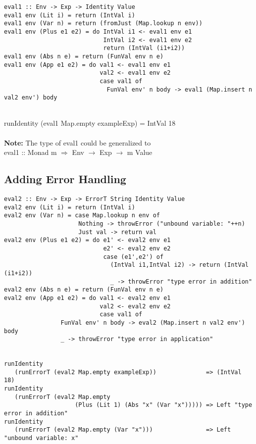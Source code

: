 \documentclass[a4paper,10pt]{article}
\begin{document}
\begin{verbatim}
eval1 :: Env -> Exp -> Identity Value
eval1 env (Lit i) = return (IntVal i)
eval1 env (Var n) = return (fromJust (Map.lookup n env))
eval1 env (Plus e1 e2) = do IntVal i1 <- eval1 env e1
                            IntVal i2 <- eval1 env e2
                            return (IntVal (i1+i2))
eval1 env (Abs n e) = return (FunVal env n e)
eval1 env (App e1 e2) = do val1 <- eval1 env e1
                           val2 <- eval1 env e2
                           case val1 of
                             FunVal env' n body -> eval1 (Map.insert n val2 env') body

\end{verbatim}
\\runIdentity (eval1 Map.empty exampleExp) = IntVal 18\\
\\ \textbf{Note:}
The type of eval1 could be generalized to\\
eval1 :: Monad m $\Rightarrow$ Env $\rightarrow$ Exp $\rightarrow$ m Value
\newpage
\subsection{Adding Error Handling}

\begin{verbatim}
eval2 :: Env -> Exp -> ErrorT String Identity Value
eval2 env (Lit i) = return (IntVal i)
eval2 env (Var n) = case Map.lookup n env of
                     Nothing -> throwError ("unbound variable: "++n) 
                     Just val -> return val
eval2 env (Plus e1 e2) = do e1' <- eval2 env e1
                            e2' <- eval2 env e2
                            case (e1',e2') of
                              (IntVal i1,IntVal i2) -> return (IntVal (i1+i2))
                              _ -> throwError "type error in addition"
eval2 env (Abs n e) = return (FunVal env n e)
eval2 env (App e1 e2) = do val1 <- eval2 env e1
                           val2 <- eval2 env e2
                           case val1 of
                FunVal env' n body -> eval2 (Map.insert n val2 env') body   
                _ -> throwError "type error in application"        

                
runIdentity 
   (runErrorT (eval2 Map.empty exampleExp))              => (IntVal 18)                 
runIdentity 
   (runErrorT (eval2 Map.empty 
                    (Plus (Lit 1) (Abs "x" (Var "x"))))) => Left "type error in addition"
runIdentity 
   (runErrorT (eval2 Map.empty (Var "x")))               => Left "unbound variable: x"                     
\end{verbatim}
\end{document}
